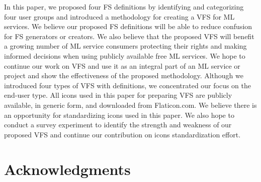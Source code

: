 \documentclass[manuscript,screen,review]{acmart}
\begin{document}
	In this paper, we proposed four FS definitions by identifying and categorizing four user groups and introduced a methodology for creating a VFS for ML services. We believe our proposed FS definitions will be able to reduce confusion for FS generators or creators. We also believe that the proposed VFS will benefit a growing number of ML service consumers protecting their rights and making informed decisions when using publicly available free ML services. We hope to continue our work on VFS and use it as an integral part of an ML service or project and show the effectiveness of the proposed methodology. Although we introduced four types of VFS with definitions, we concentrated our focus on the end-user type. All icons used in this paper for preparing VFS are publicly available, in generic form, and downloaded from Flaticon.com. We believe there is an opportunity for standardizing icons used in this paper. We also hope to conduct a survey experiment to identify the strength and weakness of our proposed VFS and continue our contribution on icons standardization effort.
	

\section{Acknowledgments}



\end{document}
